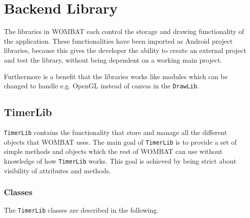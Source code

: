 \section{Backend Library}
\label{sec:backend}
The libraries in WOMBAT each control the storage and drawing functionality of the application.
These functionalities have been imported as Android project libraries, because this gives the developer the ability to create an external project and test the library, without being dependent on a working main project.

Furthermore is a benefit that the libraries works like modules which can be changed to handle e.g. OpenGL instead of canvas in the \texttt{DrawLib}.


\subsection{TimerLib}
\texttt{TimerLib} contains the functionality that store and manage all the different objects that WOMBAT uses. The main goal of \texttt{TimerLib} is to provide a set of simple methods and objects which the rest of WOMBAT can use without knowledge of how \texttt{TimerLib} works. This goal is achieved by being strict about visibility of attributes and methods.

\subsubsection{Classes}
The \texttt{TimerLib} classes are described in the following.


